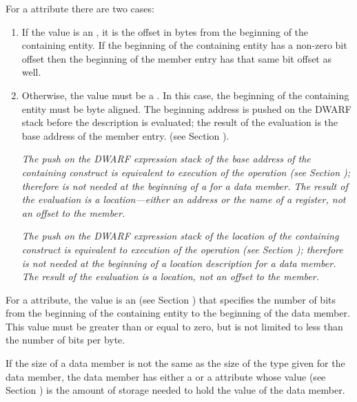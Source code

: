 For a \DWATdatamemberlocation{} attribute
there are two cases:
\begin{enumerate}[1. ]
\item If the value is an
,
it is the offset
in bytes from the beginning of the containing entity. If
the beginning of the containing entity has a non-zero bit
offset then the beginning of the member entry has that same
bit offset as well.

\item Otherwise, the value must be a .  In this case, the beginning of the containing entity
must be byte aligned. The beginning address is pushed on the DWARF
stack before the  description is evaluated; the
result of the evaluation is the base address of the member
entry. (see Section ).

\textit{The push on the DWARF expression stack of the base address of
the containing construct is equivalent to execution of the
\DWOPpushobjectaddress{} operation
(see Section );
\DWOPpushobjectaddress{} therefore
is not needed at the
beginning of a  for a data member.
The
result of the evaluation is a location---either an address or
the name of a register, not an offset to the member.}

\textit{The push on the DWARF expression stack of the location of the
  containing construct is equivalent to execution of the
  \DWOPpushobjectaddress{} operation (see Section
  ); \DWOPpushobjectaddress{}
  therefore is not needed at the beginning of a location description
  for a data member. The result of the evaluation is a location, not
  an offset to the member.}

\end{enumerate}

For a \DWATdatabitoffset{} attribute,
the value is an 
(see Section )
that specifies the number of bits
from the beginning of the containing entity to the beginning
of the data member. This value must be greater than or equal
to zero, but is not limited to less than the number of bits
per byte.

If the size of a data member is not the same as the size
of the type given for the data member, the data member has
either a \DWATbytesize{}
or a \DWATbitsize{} attribute whose
 value
(see Section )
is the amount
of storage needed to hold the value of the data member.

